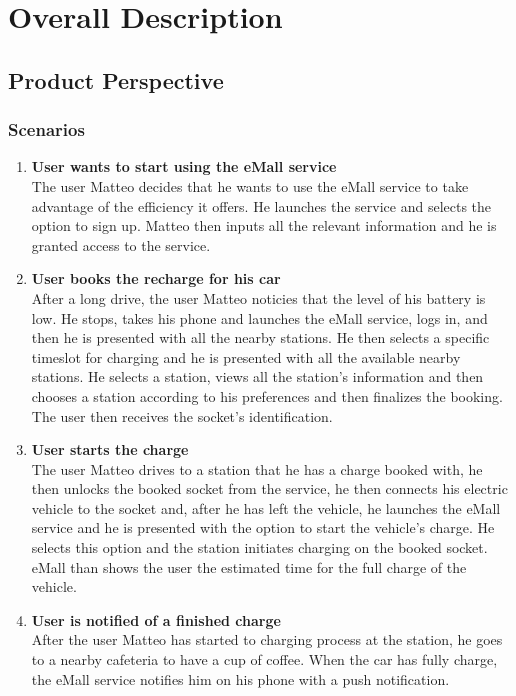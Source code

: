 \section{Overall Description}
\subsection{Product Perspective}
\subsubsection{Scenarios}
\begin{enumerate}
    \item \textbf{User wants to start using the eMall service}\\
    The user Matteo decides that he wants to use the eMall service to 
    take advantage of the efficiency it offers. 
    He launches the service and selects the option to sign up. 
    Matteo then inputs all the relevant information and he is granted access to the service.
    \item \textbf{User books the recharge for his car}\\
    After a long drive, the user Matteo noticies that the level of his battery is low. 
    He stops, takes his phone and launches the eMall service, logs in, and then he is presented with all the nearby stations.
    He then selects a specific timeslot for charging and he is presented with all the available nearby stations.
    He selects a station, views all the station's information and then chooses a station according to his preferences and then finalizes the booking.
    The user then receives the socket's identification.
    \item \textbf{User starts the charge}\\
    The user Matteo drives to a station that he has a charge booked with, he then unlocks the booked socket from the service, he then connects his electric 
    vehicle to the socket and, after he has left the vehicle, he launches the eMall service and 
    he is presented with the option to start the vehicle's charge. He selects this option and the station initiates charging on the booked socket. eMall than shows the user the estimated time for the full charge of the vehicle. 
    \item \textbf{User is notified of a finished charge}\\
    After the user Matteo has started to charging process at the station,
     he goes to a nearby cafeteria to have a cup of coffee. When the car has fully charge, the eMall service notifies him on his phone with a push notification.

\end{enumerate}
